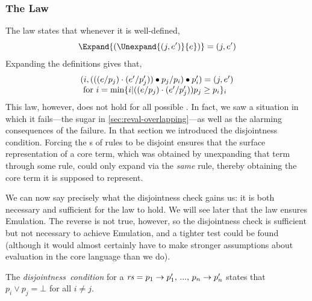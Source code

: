 \subsubsection{The {\Putget} Law}
\label{sec:reval-putget}
\label{sec:reval-disjoint}
The {\Putget} law states that whenever it is well-defined,
\[ \Expand{(\Unexpand{(j, e')}{e})} = (j, e') \]
Expanding the definitions gives that,
\[\begin{array}{lcll}
(i, (((e / p_j) \cdot (e' / p_j')) \bullet p_j / p_i) \bullet p_i')
  = (j, e') \\
   \text{ for $i = \text{min} \{i |
               ((e / p_j) \cdot (e' / p_j'))p_j \geq p_i\}_i$}
\end{array}\]
This law, however, does not hold for all possible {}. In fact,
we saw a situation in which it fails---the  sugar in
\cref{sec:reval-overlapping}---as well as the alarming consequences of the
failure. In that section we introduced the disjointness condition.
Forcing the s of rules to be disjoint ensures that the surface
representation of a core term, which was obtained by unexpanding that term
through some rule, could only expand via the \emph{same} rule, thereby
obtaining the core term it is supposed to represent.

We can now say precisely what the disjointness check gains us: it is both
necessary and sufficient for the {\Putget} law to hold.  We will see later
that the {\Putget} law ensures Emulation. The reverse is not true, however,
so the disjointness check is sufficient but not necessary to achieve
Emulation, and a tighter test could be found (although it would almost
certainly have to make stronger assumptions about evaluation in the core
language than we do).

\begin{definition}
The \emph{disjointness~condition} for a {} $\mathit{rs} = p_1 \to
p_1',\,...,\,p_n \to p_n'$ states that $p_i \!\vee\! p_j = \bot$ for all
$i \neq j$.
\end{definition}

